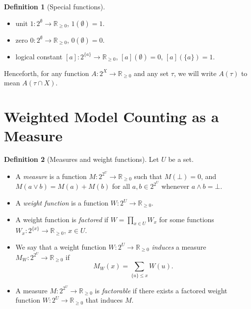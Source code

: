 \documentclass{article}
\theoremstyle{definition}
\newtheorem{definition}{Definition}
\theoremstyle{remark}
\begin{document}
\begin{definition}[Special functions]
  \phantom{}
  \begin{itemize}
  \item unit $1\colon 2^\emptyset \to \mathbb{R}_{\ge 0}$, $1(\emptyset) = 1$.
  \item zero $0\colon 2^\emptyset \to \mathbb{R}_{\ge 0}$, $0(\emptyset) = 0$.
  \item logical constant $[a]\colon 2^{\{a\}} \to \mathbb{R}_{\ge 0}$,
    $[a](\emptyset) = 0$, $[a](\{a\}) = 1$.
  \end{itemize}
\end{definition}

Henceforth, for any function $A\colon 2^X \to \mathbb{R}_{\ge 0}$ and any set
$\tau$, we will write $A(\tau)$ to mean $A(\tau \cap X)$.

\section{Weighted Model Counting as a Measure}

\begin{definition}[Measures and weight functions] \label{def:wmc}
  Let $U$ be a set.
  \begin{itemize}
  \item A \emph{measure} is a function $M\colon 2^{2^U} \to \mathbb{R}_{\ge 0}$
    such that $M(\bot) = 0$, and $M(a \lor b) = M(a) + M(b)$ for all $a, b \in
    2^{2^U}$ whenever $a \land b = \bot$.
  \item A \emph{weight function} is a function $W\colon 2^U \to \mathbb{R}_{\ge
      0}$.
  \item A weight function is \emph{factored} if $W = \prod_{x \in U} W_x$ for
    some functions $W_x\colon 2^{\{x\}} \to \mathbb{R}_{\ge 0}$, $x \in U$.
  \item We say that a weight function $W\colon 2^U \to \mathbb{R}_{\ge 0}$
    \emph{induces} a measure $M_W\colon 2^{2^U} \to \mathbb{R}_{\ge 0}$ if
    \begin{equation} \label{eq:induced_measure}
      M_W(x) = \sum_{\{u\} \le x} W(u).
    \end{equation}
  \item A measure $M\colon 2^{2^U} \to \mathbb{R}_{\ge 0}$ is
    \emph{factorable} if there exists a factored weight function $W\colon 2^U
    \to \mathbb{R}_{\ge 0}$ that induces $M$.
  \end{itemize}
\end{definition}
\end{document}
